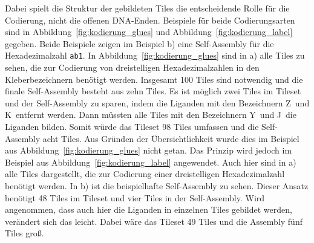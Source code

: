 Dabei spielt die Struktur der gebildeten Tiles die entscheidende Rolle für die Codierung, nicht die offenen DNA-Enden.
Beispiele für beide Codierungsarten sind in Abbildung~\ref{fig:kodierung_glues} und Abbildung~\ref{fig:kodierung_label} gegeben. Beide Beispiele zeigen im Beispiel b) eine Self-Assembly für die Hexadezimalzahl \texttt{ab1}. In Abbildung~\ref{fig:kodierung_glues} sind in a) alle Tiles zu sehen, die zur Codierung von dreistelligen Hexadezimalzahlen in den Kleberbezeichnern benötigt werden. Insgesamt 100 Tiles sind notwendig und die finale Self-Assembly besteht aus zehn Tiles. Es ist möglich zwei Tiles im Tileset und der Self-Assembly zu sparen, indem die Liganden mit den Bezeichnern \glqq Z\grqq\, und \glqq K\grqq\, entfernt werden. Dann müssten alle Tiles mit den Bezeichnern \glqq Y\grqq\, und \glqq J\grqq\ die Liganden bilden. Somit würde das Tileset 98 Tiles umfassen und die Self-Assembly acht Tiles. Aus Gründen der Übersichtlichkeit wurde dies im Beispiel aus Abbildung~\ref{fig:kodierung_glues} nicht getan. Das Prinzip wird jedoch im Beispiel aus Abbildung~\ref{fig:kodierung_label} angewendet. Auch hier sind in a) alle Tiles dargestellt, die zur Codierung einer dreistelligen Hexadezimalzahl benötigt werden. In b) ist die beispielhafte Self-Assembly zu sehen. Dieser Ansatz benötigt 48 Tiles im Tileset und vier Tiles in der Self-Assembly. Wird angenommen, dass auch hier die Liganden in einzelnen Tiles gebildet werden, verändert sich das leicht. Dabei wäre das Tileset 49 Tiles und die Assembly fünf Tiles groß.

